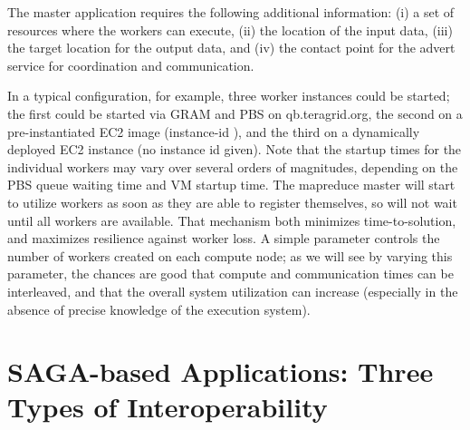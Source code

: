 \documentclass[3p,twocolumn]{elsarticle}
\begin{document}
The master application requires the following additional information:
(i) a set of resources where the workers can execute, (ii) the
location of the input data, (iii) the target location for the output
data, and (iv) the contact point for the advert service for
coordination and communication.  

In a typical configuration, for example, three worker instances could
be started; the first could be started via GRAM and PBS on
qb.teragrid.org, the second on a pre-instantiated EC2 image
(instance-id ), and the third on a dynamically deployed
EC2 instance (no instance id given).  Note that the startup times for
the individual workers may vary over several orders of magnitudes,
depending on the PBS queue waiting time and VM startup time.  The
mapreduce master will start to utilize workers as soon as they are
able to register themselves, so will not wait until all workers are
available.  That mechanism both minimizes time-to-solution, and
maximizes resilience against worker loss.
%
%
A simple parameter controls the number of workers created on each
compute node; as we will see by varying this parameter, the chances
are good that compute and communication times can be interleaved, and
that the overall system utilization can increase (especially in the
absence of precise knowledge of the execution system).
 

\section{SAGA-based Applications: Three Types of Interoperability}
\label{sec:interop}
\end{document}
